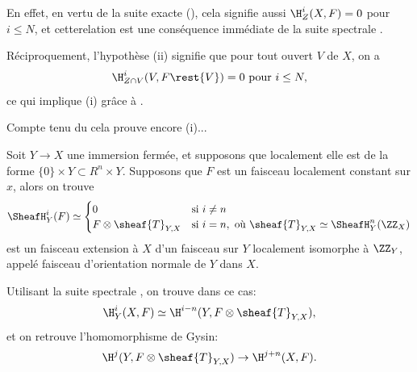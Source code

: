 En effet, en vertu de la suite exacte (), cela signifie aussi $\H^i_Z(X, F)=0$ pour $i\leq N$, et cette\pageoriginale relation est une cons\'equence imm\'ediate de la suite spectrale .

R\'eciproquement, l'hypoth\`ese  (ii) signifie que pour tout ouvert $V$ de $X$, on a
$$
\H^i_{Z\cap V}(V, F\rest{V}) =0 \text{ pour } i\leq N,
$$
ce qui implique  (i) gr\^ace \`a . 

Compte tenu du  cela prouve encore  (i)...

\begin{remarquestar}
Soit $Y \to X$ une immersion ferm\'ee, et supposons que localement elle est de la forme $\{0\}\times Y \subset R^n \times Y$. Supposons que $F$ est un faisceau localement constant sur $x$, alors on trouve
\begin{equation} \label{eq:I.30}
\SheafH_Y^i (F)\simeq
\begin{cases}
0 &\text{si } i \neq n\\
F\otimes \sheaf{T}_{Y, X}& \text{si } i=n, \text{ o\`u } \sheaf{T}_{Y, X} \simeq \SheafH_Y^n(\ZZ_X)
\end{cases}
\end{equation}
est un faisceau extension \`a $X$ d'un faisceau sur $Y$ localement isomorphe \`a $\ZZ_Y$, appel\'e \og faisceau d'orientation normale de $Y$ dans $X$\fg.
\end{remarquestar}

Utilisant la suite spectrale , on trouve dans ce cas:
\begin{equation} \label{eq:I.31}
\H^i_Y(X, F)\simeq \H^{i-n}(Y, F\otimes \sheaf{T}_{Y, X}),
\end{equation}
et on retrouve l'\og homomorphisme de Gysin\label{hgysin}\fg:
\begin{equation} \label{eq:I.32} {\H^j(Y, F\otimes \sheaf{T}_{Y, X}) \to \H^{j+n}(X, F)}.
\end{equation}

